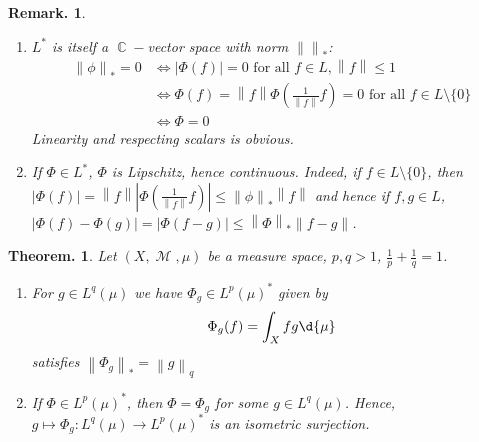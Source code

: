 \documentclass[11pt, a4paper]{memoir}
\DeclareMathOperator{\C}{{\mathbb{C}}}
\newcommand{\norm}[1]{\ensuremath{\left\lVert#1\right\rVert}}
\theoremstyle{change}
\newtheorem{theorem}{Theorem.}[section]
\theoremstyle{plain}
\theoremstyle{nonumberplain}
\newtheorem{remark}{Remark.}
\DeclareMathOperator{\M}{{\mathcal{M}}}
\begin{document}
\begin{remark}
    \begin{enumerate}
        \item $L^*$ is itself a $\C-$vector space with norm $\norm{}_*$:
            \begin{align*}
                \norm{\phi}_*=0 &\Leftrightarrow |\Phi(f)|=0\text{ for all $f\in L$}, \norm{f}\leq 1\\
                                &\Leftrightarrow \Phi(f)=\norm{f}\Phi\left(\frac{1}{\norm{f}}f\right)=0\text{ for all }f\in L\setminus\{0\}\\
                                &\Leftrightarrow \Phi=0
            \end{align*}
            Linearity and respecting scalars is obvious.
        \item If $\Phi\in L^*$, $\Phi$ is Lipschitz, hence continuous.
            Indeed, if $f\in L\setminus\{0\}$, then $|\Phi(f)|=\norm{f}\left\lvert\Phi\left(\frac{1}{\norm{f}}f\right)\right\rvert\leq\norm{\phi}_*\norm{f}$ and hence if $f,g\in L$, $|\Phi(f)-\Phi(g)|=|\Phi(f-g)|\leq\norm{\Phi}_*\norm{f-g}$.
    \end{enumerate}
\end{remark}
\begin{theorem}
    Let $(X,\M,\mu)$ be a measure space, $p,q>1$, $\frac{1}{p}+\frac{1}{q}=1$.
    \begin{enumerate}[nolistsep,label=(\roman*)]
        \item For $g\in L^q(\mu)$ we have $\Phi_g\in L^p(\mu)^*$ given by
            \begin{equation*}
                \Phi_g(f)=\int_X fg\d{\mu}
            \end{equation*}
            satisfies $\norm{\Phi_g}_*=\norm{g}_q$
        \item If $\Phi\in L^p(\mu)^*$, then $\Phi=\Phi_g$ for some $g\in L^q(\mu)$.
            Hence, $g\mapsto\Phi_g:L^q(\mu)\to L^p(\mu)^*$ is an isometric surjection.
    \end{enumerate}
\end{theorem}
\end{document}
